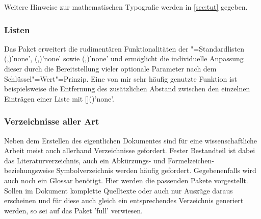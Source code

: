Weitere Hinweise zur mathematischen Typografie werden in \autoref{sec:tut} 
gegeben.%
%



\subsubsection{%
  Listen%
}

\begin{DeclarePackages}
  Das Paket  erweitert die rudimentären Funktionalitäten der 
  "=Standardlisten
  (,)'none',
  (,)'none' sowie
  (,)'none' und
  ermöglicht die individuelle Anpassung dieser durch die Bereitstellung vieler 
  optionale Parameter nach dem Schlüssel"=Wert"=Prinzip. Eine von mir sehr 
  häufig genutzte Funktion ist beispielsweise die Entfernung des zusätzlichen 
  Abstand zwischen den einzelnen Einträgen einer Liste mit 
  []()'none'.
\end{DeclarePackages}



\subsubsection{%
  Verzeichnisse aller Art%
}

Neben dem Erstellen des eigentlichen Dokumentes sind für eine wissenschaftliche 
Arbeit meist auch allerhand Verzeichnisse gefordert. Fester Bestandteil ist 
dabei das Literaturverzeichnis, auch ein Abkürzungs- und Formelzeichen- 
beziehungsweise Symbolverzeichnis werden häufig gefordert. Gegebenenfalls wird 
auch noch ein Glossar benötigt. Hier werden die passenden Pakete vorgestellt. 
Sollen im Dokument komplette Quelltexte oder auch nur Auszüge daraus erscheinen 
und für diese auch gleich ein entsprechendes Verzeichnis generiert werden, so 
sei auf das Paket 'full' verwiesen.

